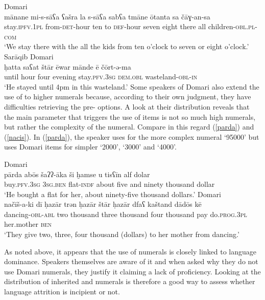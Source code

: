 \documentclass[output=paper]{langsci/langscibook}
\begin{document}
\ea
{ Domari}\\ \label{manane}
\gll mānane mi-s-sāʕa ʕašra la s-sāʕa sabʕa tmāne ōtanta sa čāɣ-an-sa\\
     stay.\textsc{ipfv.1pl} from-\textsc{det}{}-hour ten to \textsc{def}{}-hour seven eight there all children-\textsc{obl.pl-com}\\
   \glt ‘We stay there with the all the kids from ten o'clock to seven or eight o'clock.’\\
\ex \label{hatta}
{Sarāqib Domari}\\
\gll ḥatta saʕat štār ēwar mānde ē čōrt-ə{}-ma\\
     until hour four evening stay.\textsc{pfv.3sg} \textsc{dem.obl} wasteland-\textsc{obl-in}\\
\glt ‘He stayed until 4pm in this wasteland.’
\z
Some speakers of  Domari also extend the use of  to higher {numerals} because, according to their own judgment, they have difficulties retrieving the pre- options. A look at their distribution reveals that the main parameter that triggers the use of  items is not so much high {numerals}, but rather the complexity of the numeral. Compare in this regard (\ref{parda}) and (\ref{nacis}). In (\ref{parda}), the speaker uses  for the more complex numeral ‘95000’ but uses Domari items for simpler `2000', `3000' and `4000'.

\ea
{ Domari}\\ \label{parda}
\gll pārda abōs šaʔʔ-āka ši ḫamse u tisʕīn alf dolar\\
     buy.\textsc{pfv.3sg} \textsc{3sg.ben} flat\textsc{{}-indf} about five and ninety thousand dollar\\
\glt ‘He bought a flat for her, about ninety-five thousand dollars.’
\ex\label{nacis}
{ Domari}\\
\gll načīš-a-ki dī ḥazār trən ḥazār štār ḥazār dfaʕ kaštand dādōs kē\\
     dancing-\textsc{obl-abl} two thousand three thousand four thousand pay do.\textsc{prog.3pl} her.mother \textsc{ben}\\
\glt ‘They give two, three, four thousand (dollars) to her mother from dancing.’
\z

As noted above, it appears that the use of  {numerals} is closely linked to language dominance. Speakers themselves are aware of it and when asked why they do not use Domari {numerals}, they justify it claiming a lack of proficiency. Looking at the distribution of inherited and  {numerals} is therefore a good way to assess whether language attrition is incipient or not.
\end{document}
